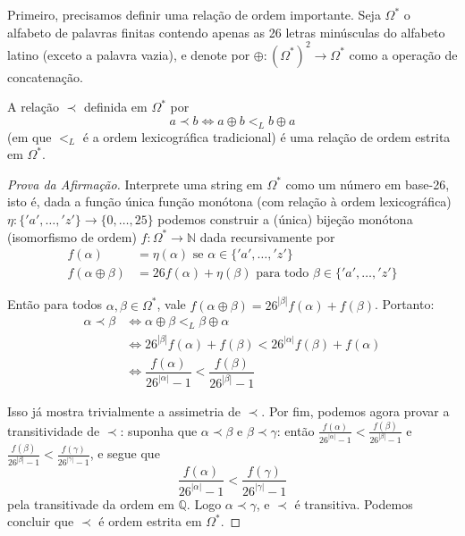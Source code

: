 \documentclass{article}
\begin{document}
\begin{solutionenv}
    Primeiro, precisamos definir uma relação de ordem importante. Seja \(\Omega^*\) o alfabeto de palavras finitas contendo apenas as 26 letras minúsculas do alfabeto latino (exceto a palavra vazia), e denote por \(\oplus: (\Omega^*)^2 \to \Omega^*\) como a operação de concatenação.
    \begin{lemma}
        A relação \(\prec\) definida em \(\Omega^*\) por %
        \[a \prec b \iff a \oplus b <_L b \oplus a\]
        (em que \(<_L\) é a ordem lexicográfica tradicional) é uma relação de ordem estrita em \(\Omega^*\).         
    \end{lemma}
    \begin{proof}[Prova da Afirmação]
        Interprete uma string em \(\Omega^*\) como um número em base-26, isto é, dada a função única função monótona (com relação à ordem lexicográfica) \(\eta:\{'a',\dots, 'z'\} \to \{0, \dotsc, 25\}\) 
        podemos construir a (única) bijeção monótona (isomorfismo de ordem) \(f: \Omega^* \to \mathbb{N}\) dada recursivamente por 
        \begin{align*}
            f(\alpha) &= \eta(\alpha) \text{ se } \alpha \in \{'a', \dotsc, 'z'\} \\
            f(\alpha \oplus \beta) &= 26f(\alpha) + \eta(\beta) \text{ para todo } \beta \in \{'a',\dotsc, 'z'\}
        \end{align*}

        Então para todos \(\alpha, \beta \in \Omega^*\), vale \(f(\alpha \oplus \beta) = 26^{|\beta|}f(\alpha) + f(\beta)\). Portanto:
        \begin{align*}
            \alpha \prec \beta &\iff \alpha \oplus \beta <_L \beta \oplus \alpha \\
            &\iff 26^{|\beta|}f(\alpha) + f(\beta) < 26^{|\alpha|}f(\beta) +f(\alpha) \\
            &\iff \dfrac{f(\alpha)}{26^{|\alpha|} - 1} < \dfrac{f(\beta)}{26^{|\beta|} - 1} 
        \end{align*}
        
        Isso já mostra trivialmente a assimetria de \(\prec\). Por fim, podemos agora provar a transitividade de \(\prec\): suponha que \(\alpha \prec \beta\) e \(\beta \prec \gamma\): então \(\frac{f(\alpha)}{26^{|\alpha|} - 1} < \frac{f(\beta)}{26^{|\beta|} - 1}\) e \(\frac{f(\beta)}{26^{|\beta|} - 1} < \frac{f(\gamma)}{26^{|\gamma|} - 1}\), e segue que
        \[\frac{f(\alpha)}{26^{|\alpha|} - 1} < \frac{f(\gamma)}{26^{|\gamma|} - 1}\]
        pela transitivade da ordem em \(\mathbb{Q}\). Logo \(\alpha \prec \gamma\), e \(\prec\) é transitiva. Podemos concluir que \(\prec\) é ordem estrita em \(\Omega^*\).  
    \end{proof}


\end{solutionenv}
\end{document}
